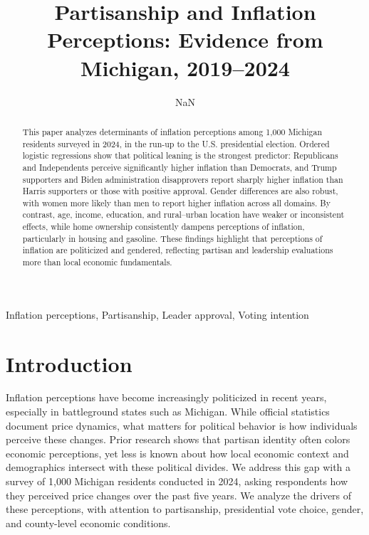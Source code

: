 \documentclass[preprint,12pt,authoryear]{elsarticle}
\begin{document}

\begin{frontmatter}

\title{Partisanship and Inflation Perceptions: Evidence from Michigan, 2019–2024}

\author[1]{NaN
}



\address[1]{NaN}




\begin{abstract}
This paper analyzes determinants of inflation perceptions among 1,000 Michigan residents surveyed in 2024, in the run-up to the U.S. presidential election. Ordered logistic regressions show that political leaning is the strongest predictor: Republicans and Independents perceive significantly higher inflation than Democrats, and Trump supporters and Biden administration disapprovers report sharply higher inflation than Harris supporters or those with positive approval. Gender differences are also robust, with women more likely than men to report higher inflation across all domains. By contrast, age, income, education, and rural–urban location have weaker or inconsistent effects, while home ownership consistently dampens perceptions of inflation, particularly in housing and gasoline. These findings highlight that perceptions of inflation are politicized and gendered, reflecting partisan and leadership evaluations more than local economic fundamentals.

\end{abstract}


\begin{keyword}
Inflation perceptions, Partisanship, Leader approval, Voting intention
\end{keyword}

\end{frontmatter}

\newpage


\section{Introduction}

Inflation perceptions have become increasingly politicized in recent years, especially in battleground states such as Michigan. While official statistics document price dynamics, what matters for political behavior is how individuals perceive these changes. Prior research shows that partisan identity often colors economic perceptions, yet less is known about how local economic context and demographics intersect with these political divides. We address this gap with a survey of 1,000 Michigan residents conducted in 2024, asking respondents how they perceived price changes over the past five years. We analyze the drivers of these perceptions, with attention to partisanship, presidential vote choice, gender, and county-level economic conditions.
\end{document}
